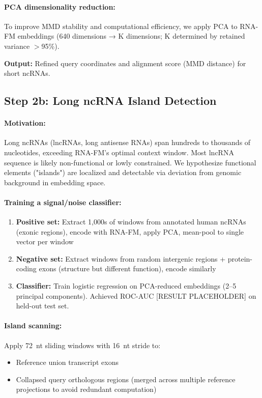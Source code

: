 \documentclass[11pt]{article}
\begin{document}
\paragraph{PCA dimensionality reduction:}
To improve MMD stability and computational efficiency, we apply PCA to RNA-FM embeddings (640 dimensions → K dimensions; K determined by retained variance $>$95\%).

\textbf{Output:} Refined query coordinates and alignment score (MMD distance) for short ncRNAs.

\subsection{Step 2b: Long ncRNA Island Detection}

\paragraph{Motivation:} Long ncRNAs (lncRNAs, long antisense RNAs) span hundreds to thousands of nucleotides, exceeding RNA-FM's optimal context window. Most lncRNA sequence is likely non-functional or lowly constrained. We hypothesize functional elements ("islands") are localized and detectable via deviation from genomic background in embedding space.

\paragraph{Training a signal/noise classifier:}
\begin{enumerate}
\item \textbf{Positive set:} Extract 1,000s of windows from annotated human ncRNAs (exonic regions), encode with RNA-FM, apply PCA, mean-pool to single vector per window
\item \textbf{Negative set:} Extract windows from random intergenic regions + protein-coding exons (structure but different function), encode similarly
\item \textbf{Classifier:} Train logistic regression on PCA-reduced embeddings (2--5 principal components). Achieved ROC-AUC [RESULT PLACEHOLDER] on held-out test set.
\end{enumerate}

\paragraph{Island scanning:}
Apply 72~nt sliding windows with 16~nt stride to:
\begin{itemize}
\item Reference union transcript exons
\item Collapsed query orthologous regions (merged across multiple reference projections to avoid redundant computation)
\end{itemize}
\end{document}

